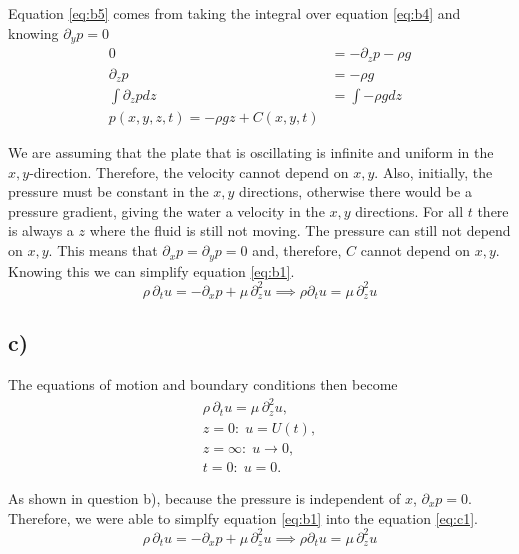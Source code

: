 \documentclass{article}
\begin{document}
Equation \ref{eq:b5} comes from taking the integral over equation \ref{eq:b4} and knowing $\partial_y p=0$
\begin{align*}
    0 &= -\partial_z p - \rho g \\
    \partial_z p &= -\rho g \\
    \int \partial_z p dz &= \int -\rho g dz \\
    p(x, y, z, t) = - \rho g z + C(x, y, t)
\end{align*}


 We are assuming that the plate that is oscillating is infinite and uniform in the $x,y$-direction. Therefore, the velocity cannot depend on $x,y$. Also, initially, the pressure must be constant in the $x,y$ directions, otherwise there would be a pressure gradient, giving the water a velocity in the $x,y$ directions. For all $t$ there is always a $z$ where the fluid is still not moving. The pressure can still not depend on $x,y$. This means that $\partial_xp = \partial_y p = 0$ and, therefore, $C$ cannot depend on $x,y$. Knowing this we can simplify equation \ref{eq:b1}.
 \begin{equation*}
 \rho \, \partial_t u = -\partial_x p + \mu \,\partial_z^2 u \implies \rho \partial_t u = \mu \,\partial_z^2 u
\end{equation*}
 
\subsection*{c)} 

The equations of motion and boundary conditions then become
\begin{align}
    \rho \,\partial_t u = \mu \,\partial_z^2 u, \label{eq:c1}\\
    z = 0 :\; u = U(t), \label{eq:c2} \\
    z = \infty :\; u \rightarrow 0, \label{eq:c3}\\
    t = 0 :\; u = 0. \label{eq:c4}
\end{align}

As shown in question b), because the pressure is independent of $x$, $\partial_x p = 0$. Therefore, we were able to simplfy equation \ref{eq:b1} into the equation \ref{eq:c1}.
\begin{equation*}
     \rho \, \partial_t u = -\partial_x p + \mu \,\partial_z^2 u \implies \rho \partial_t u = \mu \,\partial_z^2 u
\end{equation*}
\end{document}
